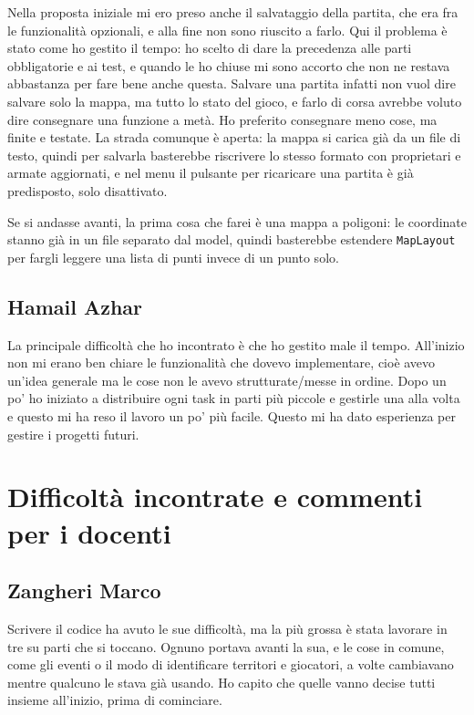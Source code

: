 \documentclass[a4paper,12pt]{report}
\begin{document}
Nella proposta iniziale mi ero preso anche il salvataggio della partita, che era fra le funzionalità opzionali, e alla fine non sono riuscito a farlo. Qui il problema è stato come ho gestito il tempo: ho scelto di dare la precedenza alle parti obbligatorie e ai test, e quando le ho chiuse mi sono accorto che non ne restava abbastanza per fare bene anche questa. Salvare una partita infatti non vuol dire salvare solo la mappa, ma tutto lo stato del gioco, e farlo di corsa avrebbe voluto dire consegnare una funzione a metà. Ho preferito consegnare meno cose, ma finite e testate. La strada comunque è aperta: la mappa si carica già da un file di testo, quindi per salvarla basterebbe riscrivere lo stesso formato con proprietari e armate aggiornati, e nel menu il pulsante per ricaricare una partita è già predisposto, solo disattivato.

Se si andasse avanti, la prima cosa che farei è una mappa a poligoni: le coordinate stanno già in un file separato dal model, quindi basterebbe estendere \texttt{MapLayout} per fargli leggere una lista di punti invece di un punto solo.

\subsection{Hamail Azhar}
La principale difficoltà che ho incontrato è che ho gestito male il tempo. All'inizio non mi erano ben chiare le funzionalità che dovevo implementare, cioè avevo un'idea generale ma le cose non le avevo strutturate/messe in ordine. Dopo un po' ho iniziato a distribuire ogni task in parti più piccole e gestirle una alla volta e questo mi ha reso il lavoro un po' più facile. Questo mi ha dato esperienza per gestire i progetti futuri.

\section{Difficoltà incontrate e commenti per i docenti}

\subsection{Zangheri Marco}
Scrivere il codice ha avuto le sue difficoltà, ma la più grossa è stata lavorare in tre su parti che si toccano. Ognuno portava avanti la sua, e le cose in comune, come gli eventi o il modo di identificare territori e giocatori, a volte cambiavano mentre qualcuno le stava già usando. Ho capito che quelle vanno decise tutti insieme all'inizio, prima di cominciare.
\end{document}
